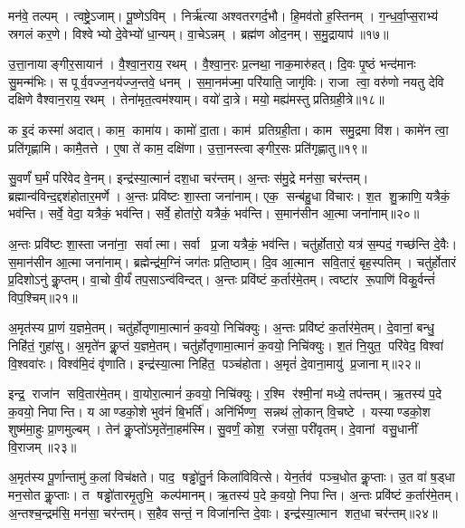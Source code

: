 मन॑वे॒ तल्पम्। त्वष्ट्रे॒ऽजाम्। पू॒ष्णेऽविम्। निर्\mbox{}ऋ॑त्या अश्वतरगर्द॒भौ। हि॒मव॑तो ह॒स्तिनम्। ग॒न्ध॒र्वा॒प्स॒राभ्य॑ स्रगलं कर॒णे। विश्वेभ्यो दे॒वेभ्यो॑ धा॒न्यम्। वा॒चेऽन्नम्। ब्रह्म॑ण ओद॒नम्। स॒मु॒द्रायाप॑॥१७॥

उ॒त्ता॒नायाङ्गीर॒सायान॑। वै॒श्वा॒न॒राय॒ रथम्। वै॒श्वा॒न॒रः प्र॒त्नथा॒ नाक॒मारु॑हत्। दि॒वः पृ॒ष्ठं भन्द॑मानः सु॒मन्म॑भिः। स पूर्व॒वज्ज॒नय॑ज्ज॒न्तवे॒ धनम्। स॒मा॒नम॑ज्मा॒ परि॑याति॒ जागृ॑विः। राजा त्वा॒ वरु॑णो नयतु देवि दक्षिणे वैश्वान॒राय॒ रथम्। तेना॑मृत॒त्वम॑श्याम्। वयो॑ दा॒त्रे। मयो॒ मह्य॑मस्तु प्रतिग्रही॒त्रे॥१८॥

क इ॒दं कस्मा॑ अदात्। काम॒ कामा॑य। कामो॑ दा॒ता। काम॑ प्रतिग्रही॒ता। काम समु॒द्रमा वि॑श। कामे॑न त्वा॒ प्रति॑गृह्णामि। कामै॒तत्ते। ए॒षा ते॑ काम॒ दक्षि॑णा। उ॒त्ता॒नस्त्वाङ्गीर॒सः प्रति॑गृह्णातु॥१९॥
\anuvakamend[दा॒ता पुरु॑ष॒मप॑ प्रतिग्रही॒त्रे नव॑ च]

सु॒वर्णं॑ घ॒र्मं परि॑वेद वे॒नम्। इन्द्र॑स्या॒त्मानं॑ दश॒धा चर॑न्तम्। अ॒न्तः स॑मु॒द्रे मन॑सा॒ चर॑न्तम्। ब्रह्मान्व॑विन्द॒द्दश॑होतार॒मर्णे। अ॒न्तः प्रवि॑ष्टः  शा॒स्ता जना॑नाम्। एक॒ सन्ब॑हु॒धा वि॑चारः। श॒त शु॒क्राणि॒ यत्रैकं॒ भव॑न्ति। सर्वे॒ वेदा॒ यत्रैकं॒ भव॑न्ति। सर्वे॒ होता॑रो॒ यत्रैकं॒ भव॑न्ति। स॒मान॑सीन आ॒त्मा जना॑नाम्॥२०॥%

अ॒न्तः प्रवि॑ष्टः  शा॒स्ता जना॑ना॒ सर्वात्मा। सर्वा प्र॒जा यत्रैकं॒ भव॑न्ति। चतु॑र्\mbox{}होतारो॒ यत्र॑ स॒म्पदं॒ गच्छ॑न्ति दे॒वैः। स॒मान॑सीन आ॒त्मा जना॑नाम्। ब्रह्मेन्द्र॑म॒ग्निं जग॑तः प्रति॒ष्ठाम्। दि॒व आ॒त्मान सवि॒तारं॒ बृह॒स्पतिम्। चतु॑र्\mbox{}होतारं प्र॒दिशोऽनु॑ कॢ॒प्तम्। वा॒चो वी॒र्यं॑ तप॒साऽन्व॑विन्दत्। अ॒न्तः प्रवि॑ष्टं क॒र्तार॑मे॒तम्। त्वष्टा॑र रू॒पाणि॑ विकु॒र्वन्तं॑ विप॒श्चिम्॥२१॥

अ॒मृत॑स्य प्रा॒णं य॒ज्ञमे॒तम्। चतु॑र्\mbox{}होतृणामा॒त्मानं॑ क॒वयो॒ निचि॑क्युः। अ॒न्तः प्रवि॑ष्टं क॒र्तार॑मे॒तम्। दे॒वानां॒ बन्धु॒ निहि॑तं॒ गुहा॑सु। अ॒मृते॑न कॢ॒प्तं य॒ज्ञमे॒तम्। चतु॑र्\mbox{}होतृणामा॒त्मानं॑ क॒वयो॒ निचि॑क्युः। श॒तं नि॒युत॒ परि॑वेद॒ विश्वा॑ वि॒श्ववा॑रः। विश्व॑मि॒दं वृ॑णाति। इन्द्र॑स्या॒त्मा निहि॑त॒ पञ्च॑होता। अ॒मृतं॑ दे॒वाना॒मायु॑ प्र॒जानाम्॥२२॥%

इन्द्र॒ राजा॑न सवि॒तार॑मे॒तम्। वा॒योरा॒त्मानं॑ क॒वयो॒ निचि॑क्युः। र॒श्मि र॑श्मी॒नां मध्ये॒ तप॑न्तम्। ऋ॒तस्य॑ प॒दे क॒वयो॒ निपान्ति। य आण्डको॒शे भुव॑नं बि॒भर्ति॑। अनि॑र्भिण्ण॒ सन्नथ॑ लो॒कान् वि॒चष्टे। यस्याण्डको॒श शुष्म॑मा॒हुः प्रा॒णमुल्बम्। तेन॑ कॢ॒प्तो॑ऽमृते॑ना॒हम॑स्मि। सु॒वर्णं॒ कोश॒ रज॑सा॒ परी॑वृतम्। दे॒वानां वसु॒धानीं  वि॒राजम्॥२३॥%

अ॒मृत॑स्य पू॒र्णान्तामु॑ क॒लां  विच॑क्षते। पाद॒ षड्ढो॑तु॒र्न किला॑विवित्से। येन॒र्तव॑ पञ्च॒धोत कॢ॒प्ताः। उ॒त वा॑ ष॒ड्धा मन॒सोत कॢ॒प्ताः। त षड्ढो॑तारमृ॒तुभि॒ कल्प॑मानम्। ऋ॒तस्य॑ प॒दे क॒वयो॒ निपान्ति। अ॒न्तः प्रवि॑ष्टं क॒र्तार॑मे॒तम्। अ॒न्तश्च॒न्द्रम॑सि॒ मन॑सा॒ चर॑न्तम्। स॒हैव सन्तं॒ न विजा॑नन्ति दे॒वाः। इन्द्र॑स्या॒त्मान शत॒धा चर॑न्तम्॥२४॥%

